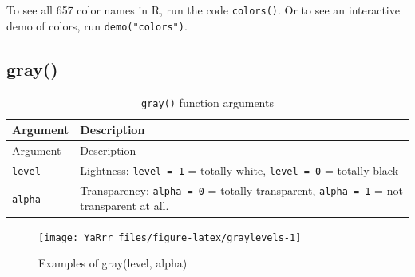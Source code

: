 \documentclass[]{book}
\theoremstyle{definition}
\theoremstyle{definition}
\theoremstyle{remark}
\begin{document}
To see all 657 color names in R, run the code \texttt{colors()}. Or to
see an interactive demo of colors, run \texttt{demo("colors")}.

\subsection{gray()}\label{gray}

\begin{longtable}[]{@{}ll@{}}
\caption{\label{tab:gray} \texttt{gray()} function arguments}\tabularnewline
\toprule
\begin{minipage}[b]{0.18\columnwidth}\raggedright\strut
Argument\strut
\end{minipage} & \begin{minipage}[b]{0.67\columnwidth}\raggedright\strut
Description\strut
\end{minipage}\tabularnewline
\midrule
\endfirsthead
\toprule
\begin{minipage}[b]{0.18\columnwidth}\raggedright\strut
Argument\strut
\end{minipage} & \begin{minipage}[b]{0.67\columnwidth}\raggedright\strut
Description\strut
\end{minipage}\tabularnewline
\midrule
\endhead
\begin{minipage}[t]{0.18\columnwidth}\raggedright\strut
\texttt{level}\strut
\end{minipage} & \begin{minipage}[t]{0.67\columnwidth}\raggedright\strut
Lightness: \texttt{level\ =\ 1} = totally white, \texttt{level\ =\ 0} =
totally black\strut
\end{minipage}\tabularnewline
\begin{minipage}[t]{0.18\columnwidth}\raggedright\strut
\texttt{alpha}\strut
\end{minipage} & \begin{minipage}[t]{0.67\columnwidth}\raggedright\strut
Transparency: \texttt{alpha\ =\ 0} = totally transparent,
\texttt{alpha\ =\ 1} = not transparent at all.\strut
\end{minipage}\tabularnewline
\bottomrule
\end{longtable}

\begin{figure}

{\centering \texttt{[image: YaRrr\_files/figure-latex/graylevels-1]} 

}

\caption{Examples of gray(level, alpha)}\label{fig:graylevels}
\end{figure}
\end{document}
